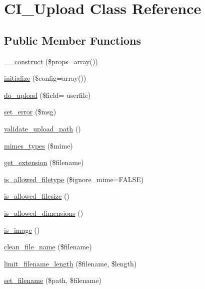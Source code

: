 \hypertarget{class_c_i___upload}{}\section{C\+I\+\_\+\+Upload Class Reference}
\label{class_c_i___upload}
\subsection*{Public Member Functions}
\begin{DoxyCompactItemize}
\item 
\hyperlink{class_c_i___upload_a563262d396a1cef6153c9998d77bb548}{\+\_\+\+\_\+construct} (\$props=array())
\item 
\hyperlink{class_c_i___upload_a481385e36d920f5a5005ace05c6cd016}{initialize} (\$config=array())
\item 
\hyperlink{class_c_i___upload_ad4cb1d2aafb3690018dfdeb09010a48c}{do\+\_\+upload} (\$field= \textquotesingle{}userfile\textquotesingle{})
\item 
\hyperlink{class_c_i___upload_a892f1ba7cba3731a3fc68f1f64e92610}{set\+\_\+error} (\$msg)
\item 
\hyperlink{class_c_i___upload_a067f092935018f0d1fbfa955ddecfee3}{validate\+\_\+upload\+\_\+path} ()
\item 
\hyperlink{class_c_i___upload_aa72da887bec3d5e3fe922c402f706209}{mimes\+\_\+types} (\$mime)
\item 
\hyperlink{class_c_i___upload_a6c656eedccb1131accc8e350bc50632f}{get\+\_\+extension} (\$filename)
\item 
\hyperlink{class_c_i___upload_a248e8cef69fc954953dc988e8d82afca}{is\+\_\+allowed\+\_\+filetype} (\$ignore\+\_\+mime=F\+A\+L\+SE)
\item 
\hyperlink{class_c_i___upload_aa1283241c3b2fc700c7b577beecd5f97}{is\+\_\+allowed\+\_\+filesize} ()
\item 
\hyperlink{class_c_i___upload_a70d66ccc85ab4ec9e76e02cfeaccc193}{is\+\_\+allowed\+\_\+dimensions} ()
\item 
\hyperlink{class_c_i___upload_af6f513bc693e3ba836f23fe9bebc6427}{is\+\_\+image} ()
\item 
\hyperlink{class_c_i___upload_ae243476bbecc4448f38fb52d7a883c32}{clean\+\_\+file\+\_\+name} (\$filename)
\item 
\hyperlink{class_c_i___upload_ab1f627192a69c4b88a44ad60ba05d0af}{limit\+\_\+filename\+\_\+length} (\$filename, \$length)
\item 
\hyperlink{class_c_i___upload_a4b09b3f2b57a8bafcac1700f43d12c36}{set\+\_\+filename} (\$path, \$filename)

\end{DoxyCompactItemize}
